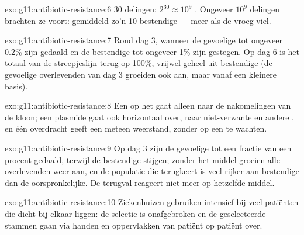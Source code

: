 \begin{solution}{exo:g11:antibiotic-resistance:6}
30 delingen: $2^{30} \approx 10^9$ . Ongeveer $10^9$ delingen
brachten ze voort: gemiddeld zo'n 10 bestendige  --- meer als de
 vroeg viel.
\end{solution}

\begin{solution}{exo:g11:antibiotic-resistance:7}
Rond dag 3, wanneer de gevoelige  tot ongeveer 0.2\% zijn gedaald
en de bestendige tot ongeveer 1\% zijn gestegen. Op dag 6 is het totaal
van de streepjeslijn terug op 100\%, vrijwel geheel uit bestendige 
(de gevoelige overlevenden van dag 3 groeiden ook aan, maar vanaf een
kleinere basis).
\end{solution}

\begin{solution}{exo:g11:antibiotic-resistance:8}
Een  op het  gaat alleen naar de nakomelingen van de kloon;
een plasmide gaat ook horizontaal over, naar niet-verwante  en
andere , en één overdracht geeft een  meteen weerstand, zonder
op een  te wachten.
\end{solution}

\begin{solution}{exo:g11:antibiotic-resistance:9}
Op dag 3 zijn de gevoelige  tot een fractie van een procent
gedaald, terwijl de bestendige stijgen; zonder het middel groeien alle
overlevenden weer aan, en de populatie die terugkeert is veel rijker aan
bestendige  dan de oorspronkelijke. De terugval reageert niet meer
op hetzelfde middel.
\end{solution}

\begin{solution}{exo:g11:antibiotic-resistance:10}
Ziekenhuizen gebruiken  intensief bij veel patiënten die dicht
bij elkaar liggen: de selectie is onafgebroken en de geselecteerde stammen
gaan via handen en oppervlakken van patiënt op patiënt over.
\end{solution}

